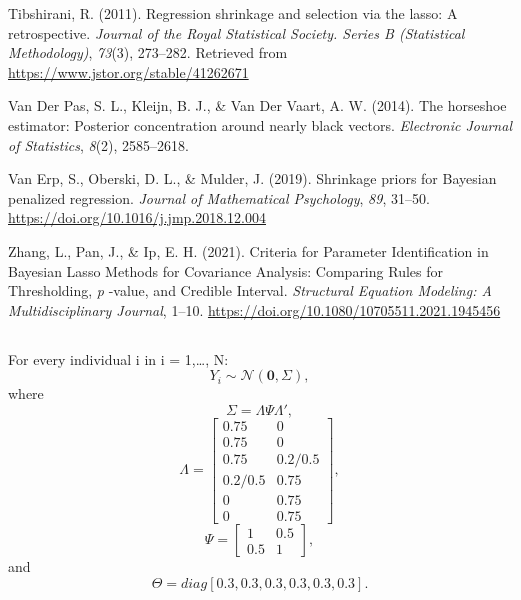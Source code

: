 \documentclass[
  man, donotrepeattitle,floatsintext]{apa6}
\newlength{\cslhangindent}
\newlength{\cslentryspacingunit} %
\newenvironment{CSLReferences}[2] %
 {%
  \setlength{\parindent}{0pt}
  \ifodd #1
  \let\oldpar\par
  \def\par{\hangindent=\cslhangindent\oldpar}
  \fi
  \setlength{\parskip}{#2\cslentryspacingunit}
 }%
 {}
\begin{document}
\begin{CSLReferences}{1}{0}
\leavevmode{}%
Tibshirani, R. (2011). Regression shrinkage and selection via the lasso: A retrospective. \emph{Journal of the Royal Statistical Society. Series B (Statistical Methodology)}, \emph{73}(3), 273--282. Retrieved from \url{https://www.jstor.org/stable/41262671}

\leavevmode{}%
Van Der Pas, S. L., Kleijn, B. J., \& Van Der Vaart, A. W. (2014). The horseshoe estimator: {Posterior} concentration around nearly black vectors. \emph{Electronic Journal of Statistics}, \emph{8}(2), 2585--2618.

\leavevmode{}%
Van Erp, S., Oberski, D. L., \& Mulder, J. (2019). Shrinkage priors for {Bayesian} penalized regression. \emph{Journal of Mathematical Psychology}, \emph{89}, 31--50. \url{https://doi.org/10.1016/j.jmp.2018.12.004}

\leavevmode{}%
Zhang, L., Pan, J., \& Ip, E. H. (2021). Criteria for {Parameter} {Identification} in {Bayesian} {Lasso} {Methods} for {Covariance} {Analysis}: {Comparing} {Rules} for {Thresholding}, \emph{p} -value, and {Credible} {Interval}. \emph{Structural Equation Modeling: A Multidisciplinary Journal}, 1--10. \url{https://doi.org/10.1080/10705511.2021.1945456}

\end{CSLReferences}

\endgroup


\clearpage
\makeatletter
\efloat@restorefloats
\makeatother


\begin{appendix}
\section{}
For every individual i in i = 1,\ldots, N:
\[Y_i \sim \mathcal{N}(\mathbf{0}, \Sigma),\] where
\[\Sigma = \Lambda\Psi\Lambda',\] \[\Lambda = 
\begin{bmatrix}
0.75 & 0 \\
0.75 & 0 \\
0.75 & 0.2/0.5 \\
0.2/0.5 & 0.75 \\
0 & 0.75 \\
0 & 0.75
\end{bmatrix},\] \[\Psi =
\begin{bmatrix}
1 & 0.5 \\
0.5 & 1
\end{bmatrix}
,\] and \[\Theta = diag[0.3, 0.3, 0.3, 0.3, 0.3, 0.3].\]
\end{appendix}
\end{document}
